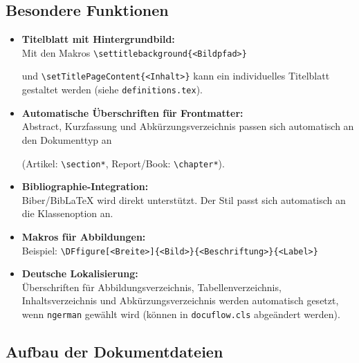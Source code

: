 \clearpage
\subsection{Besondere Funktionen}

\begin{itemize}
    \item \textbf{Titelblatt mit Hintergrundbild:}\\
    Mit den Makros \verb|\settitlebackground{<Bildpfad>}| 
    
    und \verb|\setTitlePageContent{<Inhalt>}| kann ein individuelles Titelblatt gestaltet werden (siehe \verb|definitions.tex|).

    \item \textbf{Automatische Überschriften für Frontmatter:}\\
    Abstract, Kurzfassung und Abkürzungsverzeichnis passen sich automatisch an den Dokumenttyp an 
    
    (Artikel: \verb|\section*|, Report/Book: \verb|\chapter*|).

    \item \textbf{Bibliographie-Integration:}\\
    Biber/BibLaTeX wird direkt unterstützt. Der Stil passt sich automatisch an die Klassenoption an.

    \item \textbf{Makros für Abbildungen:}\\
    Beispiel: \verb|\DFfigure[<Breite>]{<Bild>}{<Beschriftung>}{<Label>}|
    
    \item \textbf{Deutsche Lokalisierung:}\\
    Überschriften für Abbildungsverzeichnis, Tabellenverzeichnis, Inhaltsverzeichnis und Abkürzungsverzeichnis werden automatisch gesetzt, 
    wenn \texttt{ngerman} gewählt wird (können in \verb|docuflow.cls| abgeändert werden).
\end{itemize}


\clearpage

\subsection{Aufbau der Dokumentdateien}

